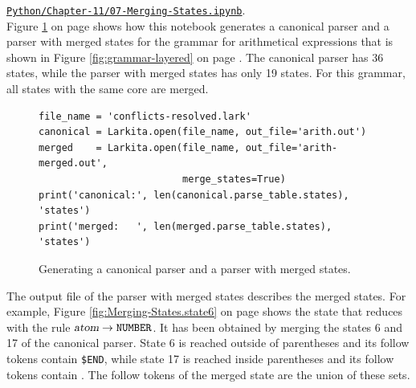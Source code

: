 \hspace*{1.3cm}
\href{https://github.com/karlstroetmann/Formal-Languages/blob/master/Python/Chapter-11/07-Merging-States.ipynb}{\texttt{Python/Chapter-11/07-Merging-States.ipynb}}.
\\[0.2cm]
Figure \ref{fig:Merging-States.ipynb} on page \pageref{fig:Merging-States.ipynb} shows how this notebook
generates a canonical parser and a parser with merged states for the grammar for arithmetical expressions that
is shown in Figure \ref{fig:grammar-layered} on page \pageref{fig:grammar-layered}.  The canonical parser has 36
states, while the parser with merged states has only 19 states.  For this grammar, all states with the same core
are merged.

\begin{figure}[!ht]
\centering
\begin{verbatim}
file_name = 'conflicts-resolved.lark'
canonical = Larkita.open(file_name, out_file='arith.out')
merged    = Larkita.open(file_name, out_file='arith-merged.out',
                         merge_states=True)
print('canonical:', len(canonical.parse_table.states), 'states')
print('merged:   ', len(merged.parse_table.states), 'states')
\end{verbatim}
\vspace*{-0.3cm}
\caption{Generating a canonical parser and a parser with merged states.}
\label{fig:Merging-States.ipynb}
\end{figure}

The output file of the parser with merged states describes the merged states.  For example, Figure
\ref{fig:Merging-States.state6} on page \pageref{fig:Merging-States.state6} shows the state that reduces with the
rule $\textsl{atom} \rightarrow \texttt{NUMBER}$.  It has been obtained by merging the states 6 and 17 of the
canonical parser.  State 6 is reached outside of parentheses and its follow tokens contain \texttt{\$END}, while
state 17 is reached inside parentheses and its follow tokens contain \saquoted{)}.  The follow tokens of the
merged state are the union of these sets.

